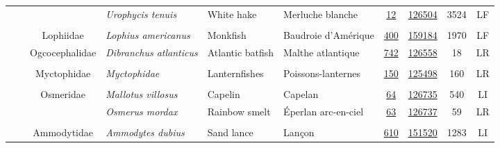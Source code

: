 \documentclass[12pt]{article}\usepackage[]{graphicx}\usepackage[]{color}
\begin{document}
\begin{landscapepage}
\begin{longtable}[t]{ccc>{\centering\arraybackslash}p{3cm}>{\centering\arraybackslash}p{3cm}>{\centering\arraybackslash}p{3cm}>{}c>{}ccc}
\hspace{1em}\hspace{1em} &  &  & \em{Urophycis tenuis} & White hake & Merluche blanche & \href{#sec:12}{12} & \href{http://www.marinespecies.org/aphia.php?p=taxdetails&id=126504}{126504} & 3524 & LF\\
\addlinespace[0.3em]
\\
\hspace{1em}\hspace{1em} &  & Lophiidae & \em{Lophius americanus} & Monkfish & Baudroie d'Amérique & \href{#sec:400}{400} & \href{http://www.marinespecies.org/aphia.php?p=taxdetails&id=159184}{159184} & 1970 & LF\\
\hspace{1em}\hspace{1em} &  & Ogcocephalidae & \em{Dibranchus atlanticus} & Atlantic batfish & Malthe atlantique & \href{#sec:742}{742} & \href{http://www.marinespecies.org/aphia.php?p=taxdetails&id=126558}{126558} & 18 & LR\\
\addlinespace[0.3em]
\\
\hspace{1em}\hspace{1em} &  & Myctophidae & \em{Myctophidae} & Lanternfishes & Poissons-lanternes & \href{#sec:150}{150} & \href{http://www.marinespecies.org/aphia.php?p=taxdetails&id=125498}{125498} & 160 & LR\\
\addlinespace[0.3em]
\\
\hspace{1em}\hspace{1em} &  & Osmeridae & \em{Mallotus villosus} & Capelin & Capelan & \href{#sec:64}{64} & \href{http://www.marinespecies.org/aphia.php?p=taxdetails&id=126735}{126735} & 540 & LI\\
\hspace{1em}\hspace{1em} &  &  & \em{Osmerus mordax} & Rainbow smelt & Éperlan arc-en-ciel & \href{#sec:63}{63} & \href{http://www.marinespecies.org/aphia.php?p=taxdetails&id=126737}{126737} & 59 & LR\\
\addlinespace[0.3em]
\\
\hspace{1em}\hspace{1em} &  & Ammodytidae & \em{Ammodytes dubius} & Sand lance & Lançon & \href{#sec:610}{610} & \href{http://www.marinespecies.org/aphia.php?p=taxdetails&id=151520}{151520} & 1283 & LI\\

\end{longtable}
\end{landscapepage}
\end{document}
